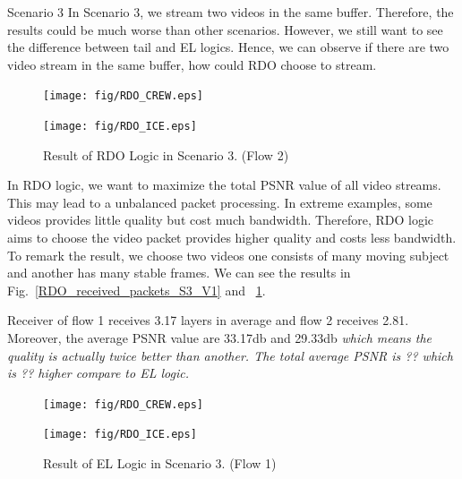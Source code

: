 \begin{subsection}{Scenario 3}
    In Scenario 3, we stream two videos in the same buffer. Therefore, the results could be much worse than other scenarios. However, we still want to see the difference between tail and EL logics. Hence, we can observe if there are two video stream in the same buffer, how could RDO choose to stream.

    \begin{figure}[tbh]
        \centering
        \begin{minipage}[t]{0.24\textwidth}
        \centering
        \texttt{[image: fig/RDO\_CREW.eps]}
        \caption{Result of RDO Logic in Scenario 3. (Flow 1)}
        \label{RDO_received_packets_S3_V1} 
        \end{minipage}
        \hfill\begin{minipage}[t]{0.23\textwidth}
        \centering
        \texttt{[image: fig/RDO\_ICE.eps]}
        \caption{Result of RDO Logic in Scenario 3. (Flow 2)}
        \label{RDO_received_packets_S3_V2} 
        \end{minipage}
        \vspace{-0.1cm}
    \end{figure}

    In RDO logic, we want to maximize the total PSNR value of all video streams. This may lead to a unbalanced packet processing. In extreme examples, some videos provides little quality but cost much bandwidth. Therefore, RDO logic aims to choose the video packet provides higher quality and costs less bandwidth. To remark the result, we choose two videos one consists of many moving subject and another has many stable frames. We can see the results in Fig.~\ref{RDO_received_packets_S3_V1} and ~\ref{RDO_received_packets_S3_V2}. 

    Receiver of flow 1 receives 3.17 layers in average and flow 2 receives 2.81. Moreover, the average PSNR value are 33.17db and 29.33db \em{which means the quality is actually twice better than another.} The total average PSNR is ?? which is ?? higher compare to EL logic.

    \begin{figure}[tbh]
        \centering
        \begin{minipage}[t]{0.24\textwidth}
        \centering
        \texttt{[image: fig/RDO\_CREW.eps]}
        \caption{Result of tail Logic in Scenario 3. (Flow 1)}
        \label{tail_received_packets_S3_V1} 
        \end{minipage}
        \hfill\begin{minipage}[t]{0.23\textwidth}
        \centering
        \texttt{[image: fig/RDO\_ICE.eps]}
        \caption{Result of EL Logic in Scenario 3. (Flow 1)}
        \label{EL_received_packets_S3_V1} 
        \end{minipage}
        \vspace{-0.1cm}
    \end{figure}


\end{subsection}
